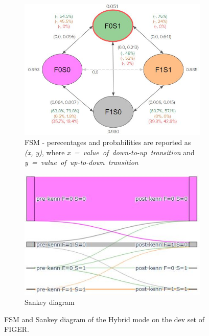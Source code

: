 \begin{figure}
     \centering
     \begin{subfigure}{0.7\textwidth}
         \centering
         \includegraphics[width=\textwidth]{figures/fsm_hybrid.JPG}
         \caption{FSM - perecentages and probabilities are reported as \textit{(x, y)}, where \textit{x~=~value~of~down-to-up~transition} and \textit{y~=~value~of~up-to-down~transition}  }
         \label{fig:fsm_hybrid}
         \vspace{15px}
     \end{subfigure}
     \vfill
     \begin{subfigure}{0.6\textwidth}
         \centering
         \includegraphics[width=\textwidth]{figures/sankey_hybrid.JPG}
         \caption{Sankey diagram}
         \label{fig:sankey_hybrid}
     \end{subfigure}
        \caption{FSM and Sankey diagram of the Hybrid mode on the dev set of FIGER.}
        \label{fig:transitions_hybrid}
\end{figure}

